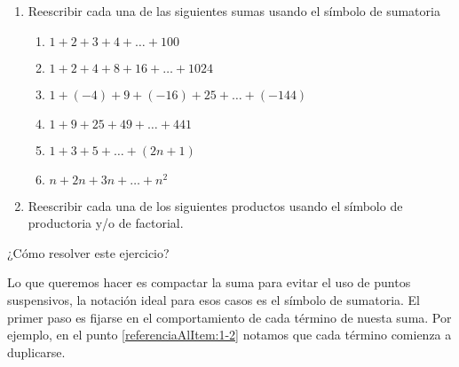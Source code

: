\begin{enunciado}{\ejercicio}
  \begin{enumerate}[label=\roman*)]
    \item Reescribir cada una de las siguientes sumas usando el símbolo de sumatoria
          \begin{multicols}{2}
            \begin{enumerate}[label=\alph*)]
              \item  $1 + 2 + 3 + 4 + \dots + 100$
              \item\label{referenciaAlItem:1-2}  $1 + 2 + 4 + 8 + 16 + \dots + 1024$
              \item  $1 + (-4) + 9 + (-16) + 25 + \dots + (-144)$
              \item $1 + 9 + 25 + 49 + \dots + 441$
              \item $1 + 3 + 5 + \dots + (2n + 1)$
              \item $n + 2n + 3n + \dots + n^2$
            \end{enumerate}
          \end{multicols}
    \item  Reescribir cada una de los siguientes productos usando el símbolo de productoria y/o de factorial.
  \end{enumerate}
\end{enunciado}

¿Cómo resolver este ejercicio?\par
Lo que queremos hacer es compactar la suma para evitar el uso
de puntos suspensivos, la notación ideal para esos casos es el símbolo de sumatoria.
El primer paso es fijarse en el comportamiento de cada término de
nuesta suma. Por ejemplo, en el punto \ref{referenciaAlItem:1-2} notamos que cada término comienza a
duplicarse.


